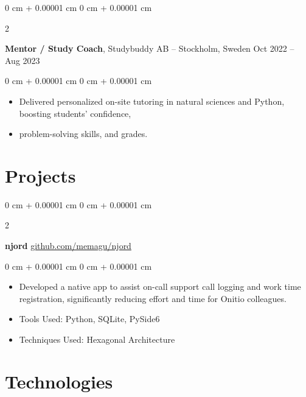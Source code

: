 \documentclass[10pt, letterpaper]{article}
\newenvironment{highlights}{
    \begin{itemize}[
        topsep=0.10 cm,
        parsep=0.10 cm,
        partopsep=0pt,
        itemsep=0pt,
        leftmargin=0 cm + 10pt
    ]
}{
    \end{itemize}
} %
\newenvironment{onecolentry}{
    \begin{adjustwidth}{
        0 cm + 0.00001 cm
    }{
        0 cm + 0.00001 cm
    }
}{
    \end{adjustwidth}
} %
\newenvironment{twocolentry}[2][]{
    \onecolentry
    \def\secondColumn{#2}
    \setcolumnwidth{\fill, 4.5 cm}
    \begin{paracol}{2}
}{
    \switchcolumn \raggedleft \secondColumn
    \end{paracol}
    \endonecolentry
} %
\begin{document}
        \vspace{0.2 cm}

        \begin{twocolentry}{
            Oct 2022 – Aug 2023
        }
            \textbf{Mentor / Study Coach}, Studybuddy AB -- Stockholm, Sweden\end{twocolentry}

        \vspace{0.10 cm}
        \begin{onecolentry}
            \begin{highlights}
                \item Delivered personalized on-site tutoring in natural sciences and Python, boosting students' confidence,
                \item problem-solving skills, and grades.
            \end{highlights}
        \end{onecolentry}



    
    \section{Projects}



        
        \begin{twocolentry}{
            \href{https://github.com/memagu/njord}{github.com/memagu/njord}
        }
            \textbf{njord}\end{twocolentry}

        \vspace{0.10 cm}
        \begin{onecolentry}
            \begin{highlights}
                \item Developed a native app to assist on-call support call logging and work time registration, significantly reducing effort and time for Onitio colleagues.
                \item Tools Used: Python, SQLite, PySide6
                \item Techniques Used: Hexagonal Architecture
            \end{highlights}
        \end{onecolentry}



    
    \section{Technologies}
\end{document}
